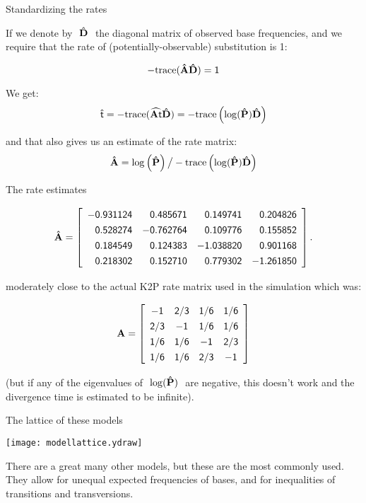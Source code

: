 \documentclass[bluish,slideColor,colorBG,pdf]{prosper}
\begin{document}
\begin{slide}[Replace]{Standardizing the rates}

If we denote by $~\mathsf{\hat{\bf D}}~$ the diagonal matrix of observed base frequencies,
and we require that the rate of (potentially-observable)
substitution is 1:

\[
\mathsf{- {\rm trace} ({\bf \hat{A} \hat{D}}) = 1}
\]

We get:
\[
\mathsf{\hat{t} = - {\rm trace} (\widehat{{\bf A}t} \hat{\bf D}) = - {\rm trace} \left(\log (\hat{\bf P})\hat{\bf D}\right)}
\]

and that also gives us an estimate of the rate matrix:
\[
\mathsf{\hat{\bf A} =  \log \left(\hat{\bf P}\right) \big/ - {\rm trace} \left(\log (\hat{\bf P})\hat{\bf D}\right)}
\]

\end{slide}

\begin{slide}[Replace]{The rate estimates}

\[
\renewcommand{\arraystretch}{1.3}
\mathsf{\hat{\bf A} = \left[
\begin{array}{r r r r}
\mathsf{-0.931124} & \mathsf{0.485671} & \mathsf{0.149741} & \mathsf{0.204826}\\
\mathsf{0.528274} & \mathsf{-0.762764} & \mathsf{0.109776} & \mathsf{0.155852}\\
\mathsf{0.184549} & \mathsf{0.124383} & \mathsf{-1.038820} & \mathsf{0.901168}\\
\mathsf{0.218302} & \mathsf{0.152710} & \mathsf{0.779302} & \mathsf{-1.261850}\\
\end{array}
\right].
}
\]

moderately close to the actual K2P rate matrix used in the
simulation which was:

\[
\renewcommand{\arraystretch}{1.3}
\mathsf{{\bf A} = \left[
\begin{array}{c c c c}
\mathsf{-1} & \mathsf{2/3} & \mathsf{1/6} & \mathsf{1/6}\\
\mathsf{2/3} & \mathsf{-1} & \mathsf{1/6} & \mathsf{1/6}\\
\mathsf{1/6} & \mathsf{1/6} & \mathsf{-1} & \mathsf{2/3}\\
\mathsf{1/6} & \mathsf{1/6} & \mathsf{2/3} & \mathsf{-1}
\end{array}
\right]
}
\]

(but if any of the eigenvalues of $~\mathsf{\log(\hat{\bf P})}~$ are negative, this doesn't
work and the divergence time is estimated to be infinite).

\end{slide}

\begin{slide}[Replace]{The lattice of these models}

\centerline{\texttt{[image: modellattice.ydraw]}}
\bigskip

There are a great many other models, but these are the most commonly used.
They allow for unequal expected frequencies of bases, and for
inequalities of transitions and transversions.

\end{slide}
\end{document}
